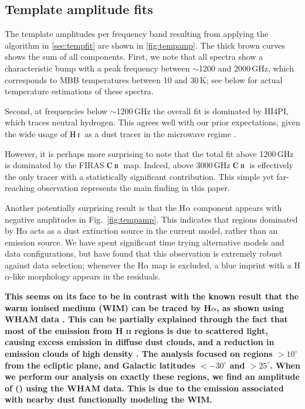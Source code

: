 \documentclass{aa}
\newcommand{\mathsc}[1]{{\normalfont\textsc{#1}}}
\newcommand{\CII}{\ensuremath{\mathsc{C\ ii}}}
\newcommand{\HI}{\ensuremath{\mathsc{H\ i}}}
\begin{document}
\subsection{Template amplitude fits}
\label{sec:tempamp}

The template amplitudes per frequency band resulting from applying the
algorithm in \cref{sec:tempfit} are shown in \cref{fig:tempamp}. The
thick brown curves shows the sum of all components. First, we note
that all spectra show a characteristic bump with a peak frequency
between $\sim$1200 and 2000\,GHz, which corresponds to MBB
temperatures between 10 and 30\,K; see below for actual temperature
estimations of these spectra.

Second, at frequencies below $\sim$1200\,GHz the overall fit is
dominated by HI4PI, which traces neutral hydrogen. This agrees well
with our prior expectations, given the wide usage of \HI\ as a dust
tracer in the microwave regime
\citep[e.g.,][]{planck2011-6.6,lenz:2017,Hensley2023}.

However, it is perhaps more surprising to note that the total fit
above 1200\,GHz is dominated by the FIRAS \CII\ map. Indeed, above
3000\,GHz \CII\ is effectively the only tracer with a statistically
significant contribution. This simple yet far-reaching observation
represents the main finding in this paper.

Another potentially surprising result is that the H$\alpha$ component
appears with negative amplitudes in Fig.~\ref{fig:tempamp}. This
indicates that regions dominated by H$\alpha$ acts as a dust
extinction source in the current model, rather than an emission
source. We have spent significant time trying alternative models
and data configurations, but have found that this observation is
extremely robust against data selection; whenever the H$\alpha$ map is
excluded, a blue imprint with a H$\alpha$-like morphology appears in
the residuals. 


\textbf{
	This seems on its face to be in contrast with the known result that the warm ionised medium (WIM) can be traced by H$\alpha$, as shown using WHAM data \citep{lagache2000}. %
	This can be partially explained through the fact that most of the emission from \textsc{H ii} regions is due to scattered light, causing excess emission in diffuse dust clouds, and a reduction in emission clouds of high density \citep{mattila2007}. %
	The \citet{lagache2000} analysis focused on regions $>10^\circ$ from the ecliptic plane, and Galactic latitudes $<-30^\circ$ and $>25^\circ$. When we perform our analysis on exactly these regions, we find an amplitude of () using the WHAM data. This is due to the emission associated with nearby dust functionally modeling the WIM.
}
\end{document}
